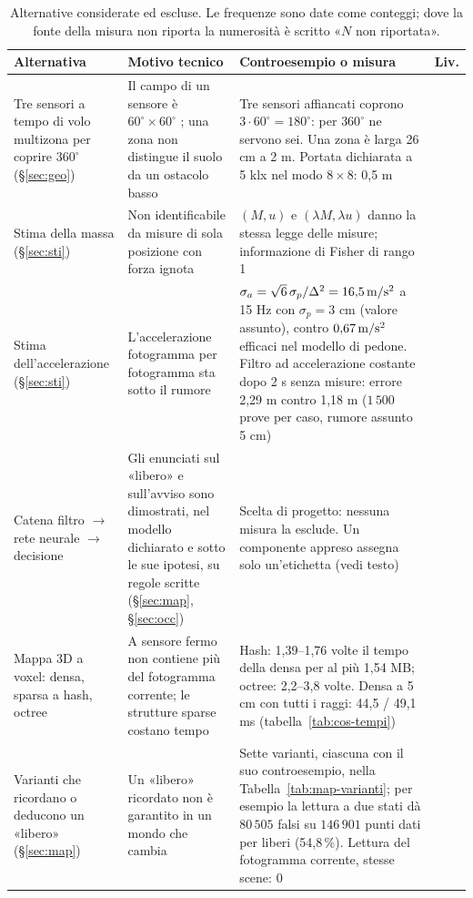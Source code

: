 \begin{table}[H]\centering\footnotesize
\caption{Alternative considerate ed escluse. Le frequenze sono date come conteggi; dove la fonte della misura non riporta la numerosità è scritto «$N$ non riportata».}\label{tab:cos-alternative}
\begin{tabularx}{\textwidth}{@{}>{\RaggedRight\arraybackslash}p{3.3cm}>{\RaggedRight\arraybackslash}p{4.4cm}Lc@{}}\toprule
Alternativa & Motivo tecnico & Controesempio o misura & Liv.\\\midrule
Tre sensori a tempo di volo multizona per coprire $360^\circ$ (\S\ref{sec:geo}) & Il campo di un sensore è $60^\circ\times60^\circ$ \cite{st-vl53l7cx}; una zona non distingue il suolo da un ostacolo basso & Tre sensori affiancati coprono $3\cdot60^\circ=180^\circ$: per $360^\circ$ ne servono sei. Una zona è larga 26 cm a 2 m. Portata dichiarata a 5 klx nel modo $8\times8$: 0,5 m \cite{st-vl53l7cx} & \\
Stima della massa (\S\ref{sec:sti}) & Non identificabile da misure di sola posizione con forza ignota & $(M,u)$ e $(\lambda M,\lambda u)$ danno la stessa legge delle misure; informazione di Fisher di rango 1 & \\
Stima dell'accelerazione (\S\ref{sec:sti}) & L'accelerazione fotogramma per fotogramma sta sotto il rumore & $\sigma_a=\sqrt6\,\sigma_p/\Delta^2=16{,}5\,\mathrm{m/s^2}$ a 15 Hz con $\sigma_p=3$ cm (valore assunto), contro $0{,}67\,\mathrm{m/s^2}$ efficaci nel modello di pedone. Filtro ad accelerazione costante dopo 2 s senza misure: errore 2,29 m contro 1,18 m ($1\,500$ prove per caso, rumore assunto 5 cm) &  \\
Catena filtro $\to$ rete neurale $\to$ decisione & Gli enunciati sul «libero» e sull'avviso sono dimostrati, nel modello dichiarato e sotto le sue ipotesi, su regole scritte (\S\ref{sec:map}, \S\ref{sec:occ}) & Scelta di progetto: nessuna misura la esclude. Un componente appreso assegna solo un'etichetta (vedi testo) & \\
Mappa 3D a voxel: densa, sparsa a hash, octree & A sensore fermo non contiene più del fotogramma corrente; le strutture sparse costano tempo & Hash: 1,39--1,76 volte il tempo della densa per al più 1,54 MB; octree: 2,2--3,8 volte. Densa a 5 cm con tutti i raggi: 44,5 / 49,1 ms (tabella~\ref{tab:cos-tempi}) & \\
Varianti che ricordano o deducono un «libero» (\S\ref{sec:map}) & Un «libero» ricordato non è garantito in un mondo che cambia & Sette varianti, ciascuna con il suo controesempio, nella Tabella~\ref{tab:map-varianti}; per esempio la lettura a due stati dà $80\,505$ falsi su $146\,901$ punti dati per liberi (54,8\,\%). Lettura del fotogramma corrente, stesse scene: 0 & \\

\end{tabularx}
\end{table}
